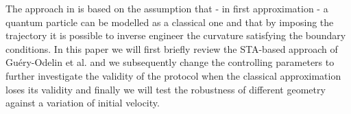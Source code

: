 The approach in \cite{QuantumControlImpens2020} is based on the assumption that - in first approximation - a quantum particle can be modelled as a classical one and that by imposing the trajectory it is possible to inverse engineer the curvature satisfying the boundary conditions.
In this paper we will first briefly review the STA-based approach of Gu\'ery-Odelin et al. and we subsequently change the controlling parameters to further investigate the validity of the protocol when the classical approximation loses its validity and finally we will test the robustness of different geometry against a variation of initial velocity.
